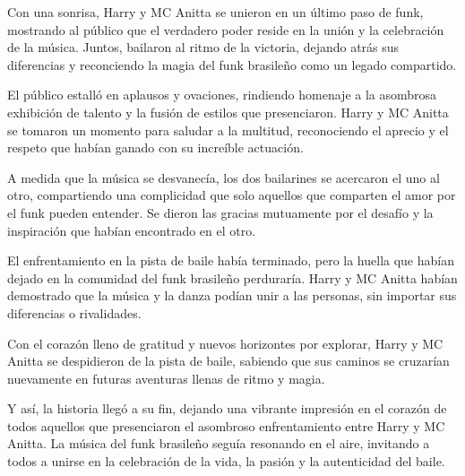 Con una sonrisa, Harry y MC Anitta se unieron en un último paso de funk, mostrando al público que el verdadero poder reside en la unión y la celebración de la música. Juntos, bailaron al ritmo de la victoria, dejando atrás sus diferencias y reconciendo la magia del funk brasileño como un legado compartido.

El público estalló en aplausos y ovaciones, rindiendo homenaje a la asombrosa exhibición de talento y la fusión de estilos que presenciaron. Harry y MC Anitta se tomaron un momento para saludar a la multitud, reconociendo el aprecio y el respeto que habían ganado con su increíble actuación.

A medida que la música se desvanecía, los dos bailarines se acercaron el uno al otro, compartiendo una complicidad que solo aquellos que comparten el amor por el funk pueden entender. Se dieron las gracias mutuamente por el desafío y la inspiración que habían encontrado en el otro.

El enfrentamiento en la pista de baile había terminado, pero la huella que habían dejado en la comunidad del funk brasileño perduraría. Harry y MC Anitta habían demostrado que la música y la danza podían unir a las personas, sin importar sus diferencias o rivalidades.

Con el corazón lleno de gratitud y nuevos horizontes por explorar, Harry y MC Anitta se despidieron de la pista de baile, sabiendo que sus caminos se cruzarían nuevamente en futuras aventuras llenas de ritmo y magia.

Y así, la historia llegó a su fin, dejando una vibrante impresión en el corazón de todos aquellos que presenciaron el asombroso enfrentamiento entre Harry y MC Anitta. La música del funk brasileño seguía resonando en el aire, invitando a todos a unirse en la celebración de la vida, la pasión y la autenticidad del baile.

\pagestyle{mystyle}
